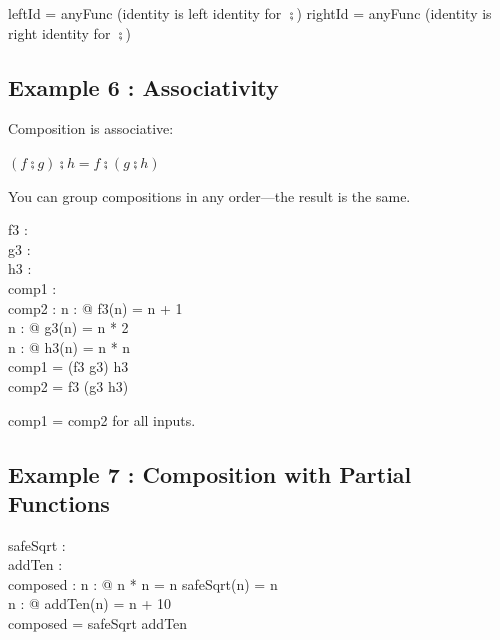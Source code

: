 \documentclass[a4paper,10pt,fleqn]{article}
\begin{document}
\noindent leftId = anyFunc (identity is left identity for $\semi$) rightId = anyFunc (identity is right identity for $\semi$)

\bigskip

\subsection*{Example 6 : Associativity}

\noindent Composition is associative:

\bigskip

\noindent $(f \semi g) \semi h = f \semi (g \semi h)$

\bigskip

\noindent You can group compositions in any order—the result is the same.

\bigskip

\begin{axdef}
f3 : \nat \fun \nat \\
g3 : \nat \fun \nat \\
h3 : \nat \fun \nat \\
comp1 : \nat \fun \nat \\
comp2 : \nat \fun \nat
\where
\forall n : \nat @ f3(n) = n + 1 \\
\forall n : \nat @ g3(n) = n * 2 \\
\forall n : \nat @ h3(n) = n * n \\
comp1 = (f3 \comp g3) \comp h3 \\
comp2 = f3 \comp (g3 \comp h3)
\end{axdef}

\noindent comp1 = comp2 for all inputs.

\bigskip

\subsection*{Example 7 : Composition with Partial Functions}

\begin{axdef}
safeSqrt : \nat \pfun \nat \\
addTen : \nat \fun \nat \\
composed : \nat \pfun \nat
\where
\forall n : \nat @ n * n = n \implies safeSqrt(n) = n \\
\forall n : \nat @ addTen(n) = n + 10 \\
composed = safeSqrt \comp addTen
\end{axdef}
\end{document}
